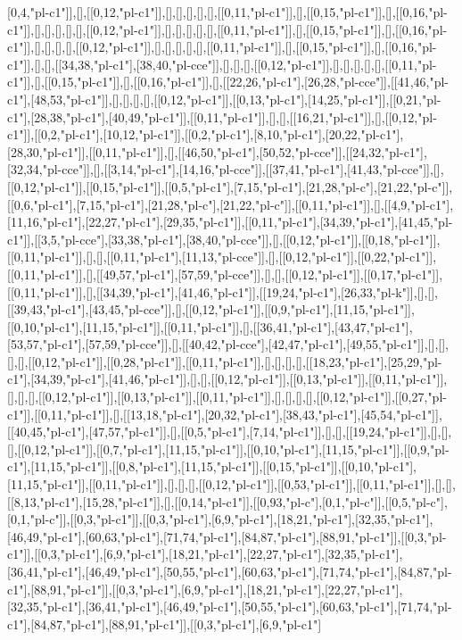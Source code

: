 [0,4,"pl-c1"]],[],[[0,12,"pl-c1"]],[],[],[],[],[],[[0,11,"pl-c1"]],[],[[0,15,"pl-c1"]],[],[[0,16,"pl-c1"]],[],[],[],[],[],[[0,12,"pl-c1"]],[],[],[],[],[],[[0,11,"pl-c1"]],[],[[0,15,"pl-c1"]],[],[[0,16,"pl-c1"]],[],[],[],[],[[0,12,"pl-c1"]],[],[],[],[],[],[[0,11,"pl-c1"]],[],[[0,15,"pl-c1"]],[],[[0,16,"pl-c1"]],[],[],[[34,38,"pl-c1"],[38,40,"pl-cce"]],[],[],[],[[0,12,"pl-c1"]],[],[],[],[],[],[[0,11,"pl-c1"]],[],[[0,15,"pl-c1"]],[],[[0,16,"pl-c1"]],[],[[22,26,"pl-c1"],[26,28,"pl-cce"]],[[41,46,"pl-c1"],[48,53,"pl-c1"]],[],[],[],[],[[0,12,"pl-c1"]],[[0,13,"pl-c1"],[14,25,"pl-c1"]],[[0,21,"pl-c1"],[28,38,"pl-c1"],[40,49,"pl-c1"]],[[0,11,"pl-c1"]],[],[],[[16,21,"pl-c1"]],[],[[0,12,"pl-c1"]],[[0,2,"pl-c1"],[10,12,"pl-c1"]],[[0,2,"pl-c1"],[8,10,"pl-c1"],[20,22,"pl-c1"],[28,30,"pl-c1"]],[[0,11,"pl-c1"]],[],[[46,50,"pl-c1"],[50,52,"pl-cce"]],[[24,32,"pl-c1"],[32,34,"pl-cce"]],[],[[3,14,"pl-c1"],[14,16,"pl-cce"]],[[37,41,"pl-c1"],[41,43,"pl-cce"]],[],[[0,12,"pl-c1"]],[[0,15,"pl-c1"]],[[0,5,"pl-c1"],[7,15,"pl-c1"],[21,28,"pl-c"],[21,22,"pl-c"]],[[0,6,"pl-c1"],[7,15,"pl-c1"],[21,28,"pl-c"],[21,22,"pl-c"]],[[0,11,"pl-c1"]],[],[[4,9,"pl-c1"],[11,16,"pl-c1"],[22,27,"pl-c1"],[29,35,"pl-c1"]],[[0,11,"pl-c1"],[34,39,"pl-c1"],[41,45,"pl-c1"]],[[3,5,"pl-cce"],[33,38,"pl-c1"],[38,40,"pl-cce"]],[],[[0,12,"pl-c1"]],[[0,18,"pl-c1"]],[[0,11,"pl-c1"]],[],[],[[0,11,"pl-c1"],[11,13,"pl-cce"]],[],[[0,12,"pl-c1"]],[[0,22,"pl-c1"]],[[0,11,"pl-c1"]],[],[[49,57,"pl-c1"],[57,59,"pl-cce"]],[],[],[[0,12,"pl-c1"]],[[0,17,"pl-c1"]],[[0,11,"pl-c1"]],[],[[34,39,"pl-c1"],[41,46,"pl-c1"]],[[19,24,"pl-c1"],[26,33,"pl-k"]],[],[],[[39,43,"pl-c1"],[43,45,"pl-cce"]],[],[[0,12,"pl-c1"]],[[0,9,"pl-c1"],[11,15,"pl-c1"]],[[0,10,"pl-c1"],[11,15,"pl-c1"]],[[0,11,"pl-c1"]],[],[[36,41,"pl-c1"],[43,47,"pl-c1"],[53,57,"pl-c1"],[57,59,"pl-cce"]],[],[[40,42,"pl-cce"],[42,47,"pl-c1"],[49,55,"pl-c1"]],[],[],[],[],[[0,12,"pl-c1"]],[[0,28,"pl-c1"]],[[0,11,"pl-c1"]],[],[],[],[],[[18,23,"pl-c1"],[25,29,"pl-c1"],[34,39,"pl-c1"],[41,46,"pl-c1"]],[],[],[[0,12,"pl-c1"]],[[0,13,"pl-c1"]],[[0,11,"pl-c1"]],[],[],[],[[0,12,"pl-c1"]],[[0,13,"pl-c1"]],[[0,11,"pl-c1"]],[],[],[],[],[[0,12,"pl-c1"]],[[0,27,"pl-c1"]],[[0,11,"pl-c1"]],[],[[13,18,"pl-c1"],[20,32,"pl-c1"],[38,43,"pl-c1"],[45,54,"pl-c1"]],[[40,45,"pl-c1"],[47,57,"pl-c1"]],[],[[0,5,"pl-c1"],[7,14,"pl-c1"]],[],[],[[19,24,"pl-c1"]],[],[],[],[[0,12,"pl-c1"]],[[0,7,"pl-c1"],[11,15,"pl-c1"]],[[0,10,"pl-c1"],[11,15,"pl-c1"]],[[0,9,"pl-c1"],[11,15,"pl-c1"]],[[0,8,"pl-c1"],[11,15,"pl-c1"]],[[0,15,"pl-c1"]],[[0,10,"pl-c1"],[11,15,"pl-c1"]],[[0,11,"pl-c1"]],[],[],[],[[0,12,"pl-c1"]],[[0,53,"pl-c1"]],[[0,11,"pl-c1"]],[],[],[[8,13,"pl-c1"],[15,28,"pl-c1"]],[],[[0,14,"pl-c1"]],[[0,93,"pl-c"],[0,1,"pl-c"]],[[0,5,"pl-c"],[0,1,"pl-c"]],[[0,3,"pl-c1"]],[[0,3,"pl-c1"],[6,9,"pl-c1"],[18,21,"pl-c1"],[32,35,"pl-c1"],[46,49,"pl-c1"],[60,63,"pl-c1"],[71,74,"pl-c1"],[84,87,"pl-c1"],[88,91,"pl-c1"]],[[0,3,"pl-c1"]],[[0,3,"pl-c1"],[6,9,"pl-c1"],[18,21,"pl-c1"],[22,27,"pl-c1"],[32,35,"pl-c1"],[36,41,"pl-c1"],[46,49,"pl-c1"],[50,55,"pl-c1"],[60,63,"pl-c1"],[71,74,"pl-c1"],[84,87,"pl-c1"],[88,91,"pl-c1"]],[[0,3,"pl-c1"],[6,9,"pl-c1"],[18,21,"pl-c1"],[22,27,"pl-c1"],[32,35,"pl-c1"],[36,41,"pl-c1"],[46,49,"pl-c1"],[50,55,"pl-c1"],[60,63,"pl-c1"],[71,74,"pl-c1"],[84,87,"pl-c1"],[88,91,"pl-c1"]],[[0,3,"pl-c1"],[6,9,"pl-c1"]